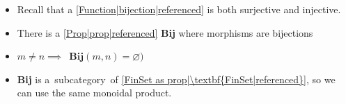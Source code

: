 
\begin{itemize}
    \item Recall that a \ref{Function|bijection|referenced} is both surjective and injective.
    \item There is a \ref{Prop|prop|referenced} \textbf{Bij} where morphisms are bijections
    \item $m\ne n \implies$ \,$\mathbf{Bij}(m,n)=\varnothing)$\,
    \item \textbf{Bij} is a \,subcategory\, of \ref{FinSet as prop|\textbf{FinSet|referenced}}, so we can use the same monoidal product.
  \end{itemize}